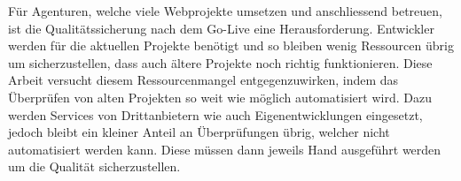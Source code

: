 Für Agenturen, welche viele Webprojekte umsetzen und anschliessend betreuen, ist die Qualitätssicherung nach dem Go-Live eine Herausforderung. Entwickler werden für die aktuellen Projekte benötigt und so bleiben wenig Ressourcen übrig um sicherzustellen, dass auch ältere Projekte noch richtig funktionieren. Diese Arbeit versucht diesem Ressourcenmangel entgegenzuwirken, indem das Überprüfen von alten Projekten so weit wie möglich automatisiert wird. Dazu werden Services von Drittanbietern wie auch Eigenentwicklungen eingesetzt, jedoch bleibt ein kleiner Anteil an Überprüfungen übrig, welcher nicht automatisiert werden kann. Diese müssen dann jeweils Hand ausgeführt werden um die Qualität sicherzustellen.